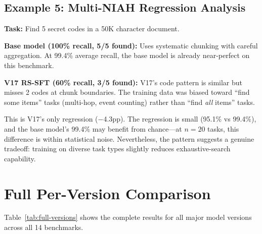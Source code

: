 \documentclass{article}
\begin{document}
\subsection{Example 5: Multi-NIAH Regression Analysis}
\label{app:traj-mniah}

\textbf{Task:} Find 5 secret codes in a 50K character document.

\textbf{Base model (100\% recall, 5/5 found):} Uses systematic chunking with careful aggregation. At 99.4\% average recall, the base model is already near-perfect on this benchmark.

\textbf{V17 RS-SFT (60\% recall, 3/5 found):} V17's code pattern is similar but misses 2 codes at chunk boundaries. The training data was biased toward ``find some items'' tasks (multi-hop, event counting) rather than ``find \emph{all} items'' tasks.

This is V17's only regression ($-$4.3pp). The regression is small (95.1\% vs 99.4\%), and the base model's 99.4\% may benefit from chance---at $n{=}20$ tasks, this difference is within statistical noise. Nevertheless, the pattern suggests a genuine tradeoff: training on diverse task types slightly reduces exhaustive-search capability.

\section{Full Per-Version Comparison}
\label{app:full-comparison}

Table~\ref{tab:full-versions} shows the complete results for all major model versions across all 14 benchmarks.
\end{document}

